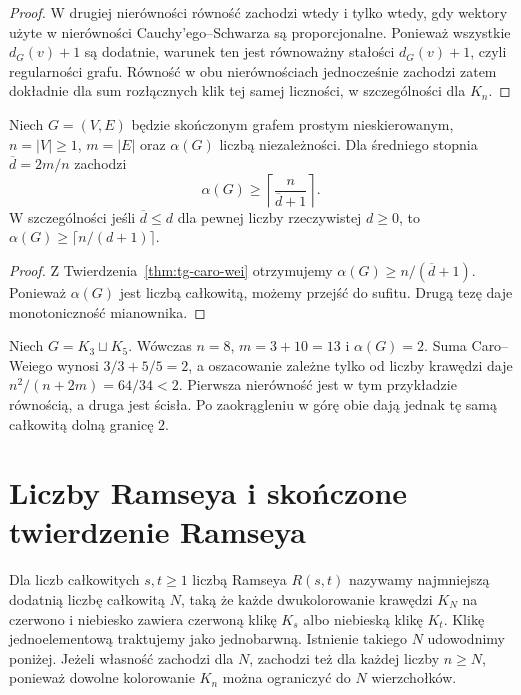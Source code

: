 \begin{proof}
W drugiej nierówności równość zachodzi wtedy
i tylko wtedy, gdy wektory użyte w nierówności
Cauchy'ego--Schwarza są proporcjonalne.
Ponieważ wszystkie $d_G(v)+1$ są dodatnie,
warunek ten jest równoważny stałości $d_G(v)+1$,
czyli regularności grafu. Równość w obu
nierównościach jednocześnie zachodzi zatem
dokładnie dla sum rozłącznych klik tej samej
liczności, w szczególności dla $K_n$.
\end{proof}

\begin{wniosek}
\label{cor:tg-caro-wei-average}
Niech $G=(V,E)$ będzie skończonym grafem prostym
nieskierowanym, $n=|V|\geq1$, $m=|E|$ oraz
$\alpha(G)$ liczbą niezależności.
Dla średniego stopnia $\overline d=2m/n$ zachodzi
\[
\alpha(G)\geq
\left\lceil\frac{n}{\overline d+1}\right\rceil.
\]
W szczególności jeśli
$\overline d\leq d$ dla pewnej
liczby rzeczywistej $d\geq0$,
to $\alpha(G)\geq\lceil n/(d+1)\rceil$.
\end{wniosek}
\begin{proof}
Z Twierdzenia~\ref{thm:tg-caro-wei}
otrzymujemy
$\alpha(G)\geq n/(\overline d+1)$.
Ponieważ $\alpha(G)$ jest liczbą
całkowitą, możemy przejść do
sufitu. Drugą tezę daje
monotoniczność mianownika.
\end{proof}

\begin{przyklad}
\label{ex:tg-caro-wei-two-cliques}
Niech $G=K_3\sqcup K_5$.
Wówczas $n=8$, $m=3+10=13$
i $\alpha(G)=2$.
Suma Caro--Weiego wynosi
$3/3+5/5=2$, a
oszacowanie zależne
tylko od liczby krawędzi
daje $n^2/(n+2m)=64/34<2$.
Pierwsza nierówność jest w tym przykładzie
równością, a druga jest ścisła. Po zaokrągleniu
w górę obie dają jednak tę samą całkowitą
dolną granicę $2$.
\end{przyklad}

\section{Liczby Ramseya i skończone twierdzenie Ramseya}
\label{sec:tg-extremal-ramsey}

\begin{definicja}
\label{def:tg-ramsey-number}
Dla liczb całkowitych $s,t\geq1$
liczbą Ramseya $R(s,t)$ nazywamy
najmniejszą dodatnią liczbę całkowitą $N$,
taką że każde dwukolorowanie krawędzi
$K_N$ na czerwono i niebiesko zawiera
czerwoną klikę $K_s$ albo niebieską
klikę $K_t$. Klikę jednoelementową
traktujemy jako jednobarwną.
Istnienie takiego $N$ udowodnimy poniżej.
Jeżeli własność zachodzi dla $N$, zachodzi też
dla każdej liczby $n\geq N$, ponieważ dowolne
kolorowanie $K_n$ można ograniczyć do $N$ wierzchołków.
\end{definicja}

